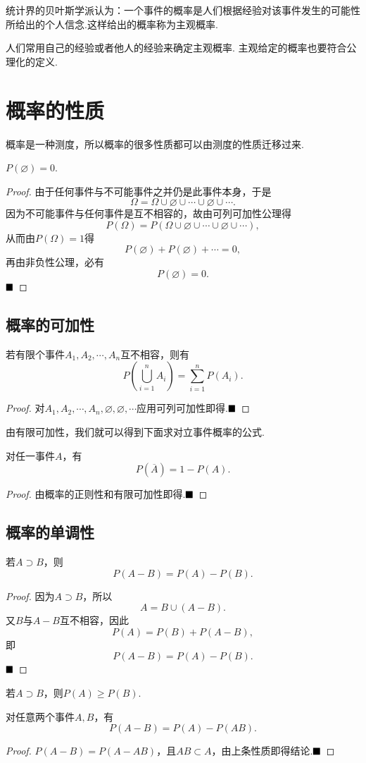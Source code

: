 统计界的贝叶斯学派认为：{\heiti 一个事件的概率是人们根据经验对该事件发生的可能性所给出的个人信念}.这样给出的概率称为{\heiti 主观概率}.

人们常用自己的经验或者他人的经验来确定主观概率. 主观给定的概率也要符合公理化的定义.

\section{概率的性质}
概率是一种测度，所以概率的很多性质都可以由测度的性质迁移过来.
\begin{theorem}
	$P(\varnothing)=0$.
\end{theorem}
\begin{proof}
	由于任何事件与不可能事件之并仍是此事件本身，于是
	$$\varOmega=\varOmega\cup\varnothing\cup\cdots\cup\varnothing\cup\cdots.$$
	因为不可能事件与任何事件是互不相容的，故由可列可加性公理得
	$$P(\varOmega)=P(\varOmega\cup\varnothing\cup\cdots\cup\varnothing\cup\cdots),$$
	从而由$P(\varOmega)=1$得
	$$P(\varnothing)+P(\varnothing)+\cdots=0,$$
	再由非负性公理，必有
	$$P(\varnothing)=0.$$
	$\hfill\blacksquare$
\end{proof}
\subsection{概率的可加性}
\begin{theorem}[有限可加性]
	若有限个事件$A_1,A_2,\cdots,A_n$互不相容，则有
	$$P\left(\bigcup_{i=1}^{n}A_i\right)=\sum_{i=1}^{n}P(A_i).$$
\end{theorem}
\begin{proof}
	对$A_1,A_2,\cdots,A_n,\varnothing,\varnothing,\cdots$应用可列可加性即得.$\hfill\blacksquare$
\end{proof}
由有限可加性，我们就可以得到下面求对立事件概率的公式.
\begin{theorem}
	对任一事件$A$，有
	$$P(\overline{A})=1-P(A).$$
\end{theorem}
\begin{proof}
	由概率的正则性和有限可加性即得.$\hfill\blacksquare$
\end{proof}
\subsection{概率的单调性}
\begin{theorem}
	若$A\supset B$，则
	$$P(A-B)=P(A)-P(B).$$
\end{theorem}
\begin{proof}
	因为$A\supset B$，所以
	$$A=B\cup(A-B).$$
	又$B$与$A-B$互不相容，因此
	$$P(A)=P(B)+P(A-B),$$
	即
	$$P(A-B)=P(A)-P(B).$$
	$\hfill\blacksquare$
\end{proof}
\begin{corollary}[单调性]
	若$A\supset B$，则$P(A)\geqslant P(B)$.
\end{corollary}
\begin{theorem}
	对任意两个事件$A,B$，有
	$$P(A-B)=P(A)-P(AB).$$
\end{theorem}
\begin{proof}
	$P(A-B)=P(A-AB)$，且$AB\subset A$，由上条性质即得结论.$\hfill\blacksquare$
\end{proof}
